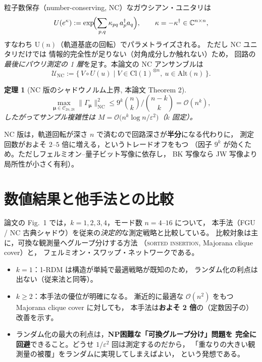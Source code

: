 \documentclass[11pt,a4paper]{ltjsarticle}
\newcommand{\ad}{a^\dagger}
\newcommand{\C}{\mathbb{C}}
\newcommand{\Uc}{\mathcal{U}}
\newcommand{\Cc}{\mathcal{C}}
\newcommand{\Cl}{\mathrm{Cl}}
\newcommand{\Alt}{\mathrm{Alt}}
\newcommand{\NC}{\mathrm{NC}}
\theoremstyle{definition}
\theoremstyle{plain}
\newtheorem{teiri}{定理}[section]
\begin{document}
粒子数保存（number-conserving, NC）なガウシアン・ユニタリは
\begin{equation}
  U(e^{\kappa}):=\exp\!\Bigl(\sum_{p,q}\kappa_{pq}\,\ad_p a_q\Bigr),
  \qquad \kappa=-\kappa^\dagger\in\C^{n\times n},
\end{equation}
すなわち $\mathrm U(n)$（軌道基底の回転）でパラメトライズされる。
ただし NC ユニタリだけでは
情報的完全性が足りない（対角成分しか触れない）ため，
回路の\emph{最後にパウリ測定の 1 層}を足す。本論文の NC アンサンブルは
\begin{equation}
  \Uc_{\NC}:=\{\,V\circ U(u)\mid V\in\Cl(1)^{\otimes n},\ u\in\Alt(n)\,\}.
\end{equation}
\begin{teiri}[NC 版のシャドウノルム上界, 本論文 Theorem 2]
\begin{equation}
  \max_{\bm\mu\in\Cc_{2n,2k}}\|\Gamma_{\bm\mu}\|^2_{\NC}
   \le 9^{k}\binom{n}{k}\Big/\binom{n-k}{k}=\mathcal O(n^k),
\end{equation}
したがってサンプル複雑性は
$M=\mathcal O\!\bigl(n^k\log n/\varepsilon^2\bigr)$（$k$ 固定）。
\end{teiri}
NC 版は，軌道回転が深さ $n$ で済むので回路深さが\textbf{半分}になる代わりに，
測定回数がおよそ $2$--$5$ 倍に増える，というトレードオフをもつ
（因子 $9^k$ が効くため。ただしフェルミオン--量子ビット写像に依存し，
BK 写像なら JW 写像より局所性が小さく有利）。

\section{数値結果と他手法との比較}\label{sec:numerics}

論文の Fig.~1 では，$k=1,2,3,4$，モード数 $n=4$--$16$ について，
本手法（FGU / NC 古典シャドウ）を従来の\emph{決定的}な測定戦略と比較している。
比較対象は主に，可換な観測量へグループ分けする方法
（\textsc{sorted insertion}, Majorana clique cover）と，
フェルミオン・スワップ・ネットワークである。

\begin{itemize}
  \item \textbf{$k=1$}：1-RDM は構造が単純で最適戦略が既知のため，
        ランダム化の利点は出ない（従来法と同等）。
  \item \textbf{$k\ge2$}：本手法の優位が明確になる。
        漸近的に最適な $\mathcal O(n^2)$ をもつ Majorana clique cover に対しても，
        本手法は\textbf{およそ 2 倍}の（定数因子の）改善を示す。
  \item ランダム化の最大の利点は，\textbf{NP困難な「可換グループ分け」問題を
        完全に回避}できること。どうせ $1/\varepsilon^2$ 回は測定するのだから，
        「重なりの大きい観測量の被覆」をランダムに実現してしまえばよい，
        という発想である。
\end{itemize}
\end{document}
